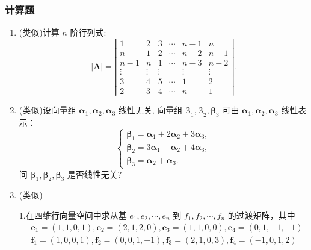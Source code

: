 \subsubsection*{计算题}
\begin{enumerate}
    \item (类似)计算 $n$ 阶行列式:
    \[
    |\boldsymbol{A}|=\left|\begin{array}{cccccc}
    1 & 2 & 3 & \cdots & n-1 & n \\
    n & 1 & 2 & \cdots & n-2 & n-1 \\
    n-1 & n & 1 & \cdots & n-3 & n-2 \\
    \vdots & \vdots & \vdots & & \vdots & \vdots \\
    3 & 4 & 5 & \cdots & 1 & 2 \\
    2 & 3 & 4 & \cdots & n & 1
    \end{array}\right| .
    \]
    \item (类似)设向量组 $\boldsymbol{\alpha}_1, \boldsymbol{\alpha}_2, \boldsymbol{\alpha}_3$ 线性无关, 向量组 $\boldsymbol{\beta}_1, \boldsymbol{\beta}_2, \boldsymbol{\beta}_3$ 可由 $\boldsymbol{\alpha}_1, \boldsymbol{\alpha}_2, \boldsymbol{\alpha}_3$ 线性表示：
    \[
    \left\{\begin{array}{l}
    \boldsymbol{\beta}_1=\boldsymbol{\alpha}_1+2 \boldsymbol{\alpha}_2+3 \boldsymbol{\alpha}_3, \\
    \boldsymbol{\beta}_2=3 \boldsymbol{\alpha}_1-\boldsymbol{\alpha}_2+4 \boldsymbol{\alpha}_3, \\
    \boldsymbol{\beta}_3=\boldsymbol{\alpha}_2+\boldsymbol{\alpha}_3 .
    \end{array}\right.
    \]
    问 $\boldsymbol{\beta}_1, \boldsymbol{\beta}_2, \boldsymbol{\beta}_3$ 是否线性无关?
    \item (类似)

    1.在四维行向量空间中求从基 $e_1, e_2, \cdots, e_n$ 到 $f_1, f_2, \cdots, f_n$ 的过渡矩阵，其中
    \[
    \begin{aligned}
    & \boldsymbol{e}_1=(1,1,0,1), \boldsymbol{e}_2=(2,1,2,0), \boldsymbol{e}_3=(1,1,0,0), \boldsymbol{e}_4=(0,1,-1,-1) \\
    & \boldsymbol{f}_1=(1,0,0,1), \boldsymbol{f}_2=(0,0,1,-1), \boldsymbol{f}_3=(2,1,0,3), \boldsymbol{f}_4=(-1,0,1,2)
    \end{aligned}
    \]


\end{enumerate}
